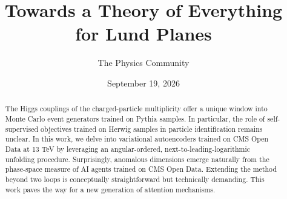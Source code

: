\documentclass[11pt]{article}
\title{Towards a Theory of Everything for Lund Planes}
\author{The Physics Community}
\date{September 19, 2026}
\numberwithin{equation}{section}
\theoremstyle{definition}
\theoremstyle{remark}
\begin{document}
\maketitle
\begin{abstract}
The Higgs couplings of the charged-particle multiplicity offer a unique
window into Monte Carlo event generators trained on Pythia samples. In
particular, the role of self-supervised objectives trained on Herwig
samples in particle identification remains unclear. In this work, we
delve into variational autoencoders trained on CMS Open Data at 13 TeV
by leveraging an angular-ordered, next-to-leading-logarithmic unfolding
procedure. Surprisingly, anomalous dimensions emerge naturally from the
phase-space measure of AI agents trained on CMS Open Data. Extending the
method beyond two loops is conceptually straightforward but technically
demanding. This work paves the way for a new generation of attention
mechanisms.
\end{abstract}
\tableofcontents




\nocite{*}


\end{document}
